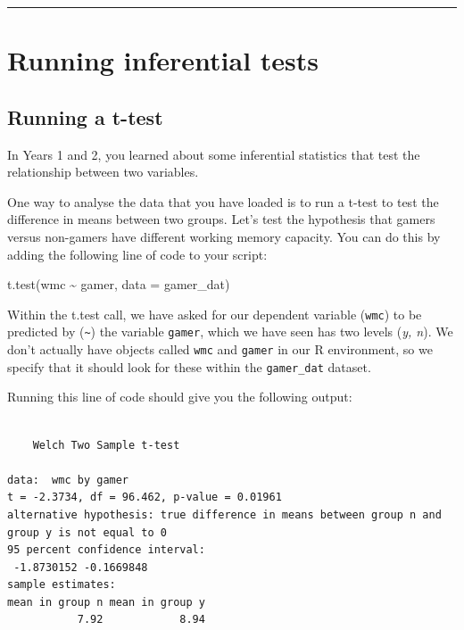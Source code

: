 \documentclass[
  a4paper,
  DIV=11,
  numbers=noendperiod]{scrreprt}
\newenvironment{Shaded}{\begin{snugshade}}{\end{snugshade}}
\newcommand{\AttributeTok}[1]{\textcolor[rgb]{0.40,0.45,0.13}{#1}}
\newcommand{\FunctionTok}[1]{\textcolor[rgb]{0.28,0.35,0.67}{#1}}
\newcommand{\NormalTok}[1]{\textcolor[rgb]{0.00,0.23,0.31}{#1}}
\newcommand{\SpecialCharTok}[1]{\textcolor[rgb]{0.37,0.37,0.37}{#1}}
\begin{document}
\begin{center}\rule{0.5\linewidth}{0.5pt}\end{center}

\chapter{Running inferential tests}\label{running-inferential-tests}

\section{Running a t-test}\label{running-a-t-test}

In Years 1 and 2, you learned about some inferential statistics that
test the relationship between two variables.

One way to analyse the data that you have loaded is to run a t-test to
test the difference in means between two groups. Let's test the
hypothesis that gamers versus non-gamers have different working memory
capacity. You can do this by adding the following line of code to your
script:

\begin{Shaded}
\begin{Highlighting}[]
\FunctionTok{t.test}\NormalTok{(wmc }\SpecialCharTok{\textasciitilde{}}\NormalTok{ gamer, }\AttributeTok{data =}\NormalTok{ gamer\_dat)}
\end{Highlighting}
\end{Shaded}

Within the t.test call, we have asked for our dependent variable
(\texttt{wmc}) to be predicted by (\texttt{\textasciitilde{}}) the
variable \texttt{gamer}, which we have seen has two levels (\emph{y,
n}). We don't actually have objects called \texttt{wmc} and
\texttt{gamer} in our R environment, so we specify that it should look
for these within the \texttt{gamer\_dat} dataset.

Running this line of code should give you the following output:

\begin{verbatim}

    Welch Two Sample t-test

data:  wmc by gamer
t = -2.3734, df = 96.462, p-value = 0.01961
alternative hypothesis: true difference in means between group n and group y is not equal to 0
95 percent confidence interval:
 -1.8730152 -0.1669848
sample estimates:
mean in group n mean in group y 
           7.92            8.94 
\end{verbatim}
\end{document}

